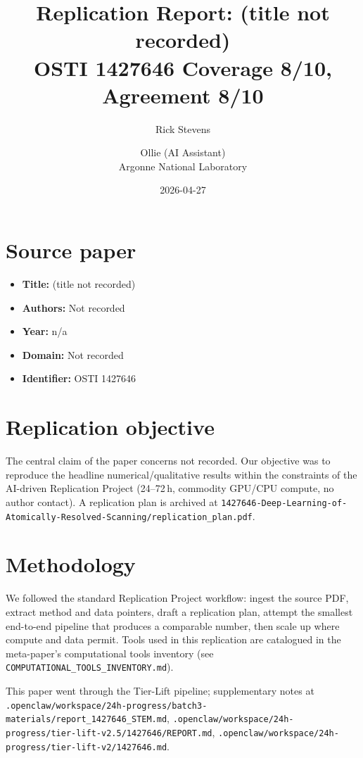 \documentclass[11pt]{article}
\title{Replication Report: (title not recorded)\\[2pt]\large OSTI 1427646 \textbar{} Coverage 8/10, Agreement 8/10}
\author{Rick Stevens \and Ollie (AI Assistant)\\\small Argonne National Laboratory}
\date{2026-04-27}
\begin{document}
\maketitle

\section{Source paper}
\begin{itemize}
\item \textbf{Title:} (title not recorded)
\item \textbf{Authors:} Not recorded
\item \textbf{Year:} n/a
\item \textbf{Domain:} Not recorded
\item \textbf{Identifier:} OSTI 1427646
\end{itemize}


\section{Replication objective}
The central claim of the paper concerns not recorded. Our objective was to reproduce the headline numerical/qualitative results within the constraints of the AI-driven Replication Project (24--72\,h, commodity GPU/CPU compute, no author contact). A replication plan is archived at \texttt{1427646-Deep-Learning-of-Atomically-Resolved-Scanning/replication\_plan.pdf}.

\section{Methodology}
We followed the standard Replication Project workflow: ingest the source PDF, extract method and data pointers, draft a replication plan, attempt the smallest end-to-end pipeline that produces a comparable number, then scale up where compute and data permit. Tools used in this replication are catalogued in the meta-paper's computational tools inventory (see \texttt{COMPUTATIONAL\_TOOLS\_INVENTORY.md}).

This paper went through the Tier-Lift pipeline; supplementary notes at \texttt{.openclaw/workspace/24h-progress/batch3-materials/report\_1427646\_STEM.md}, \texttt{.openclaw/workspace/24h-progress/tier-lift-v2.5/1427646/REPORT.md}, \texttt{.openclaw/workspace/24h-progress/tier-lift-v2/1427646.md}.
\end{document}

